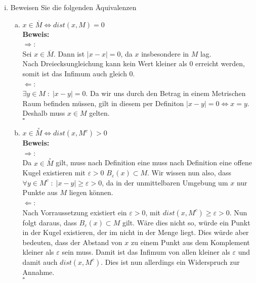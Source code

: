 \documentclass[11pt,a4paper,ngerman]{article}
\begin{document}
\begin{enumerate}[(i)]
		\item Beweisen Sie die folgenden Äquivalenzen
			\begin{enumerate}[a)]
				\item $x \in \overline{M} \Longleftrightarrow dist(x,M) = 0$\\
				\textbf{Beweis:}\\
				    $\Rightarrow$:\\
                        Sei $x \in \overline{M}$. Dann ist
                        $|x - x| = 0$, da $x$ insbesondere in $M$ lag.\\
                        Nach Dreiecksungleichung kann kein Wert kleiner als
                        0 erreicht werden, somit ist das Infimum auch gleich 0.\\

                    $\Leftarrow$:\\
                        $\exists y \in M \; : \; |x - y | = 0$. Da wir uns 
                        durch den Betrag in einem Metrischen Raum befinden müssen,
                        gilt in diesem per Definiton $|x - y| = 0 \Leftrightarrow x = y$.
                        Deshalb muss $x \in M$ gelten.\\
                    \mbox{} \hfill $\square$	

				\item $x \in \overset{\circ}{M} \Longleftrightarrow dist(x,M^c) > 0$\\
				\textbf{Beweis:}\\
				    $\Rightarrow$:\\
                        Da $x \in \overset{\circ}{M}$ gilt, muss nach Definition eine
                        muss nach Definition eine offene Kugel existieren mit $\varepsilon > 0$
                        $B_\varepsilon(x) \subset M$. Wir wissen nun also, dass
                        $\forall y \in M^c \; : \; |x - y | \geq \varepsilon > 0$, da in
                        der unmittelbaren Umgebung um $x$ nur Punkte aus $M$ liegen können.\\

                    $\Leftarrow$:\\
                        Nach Vorraussetzung existiert ein $\varepsilon > 0$, mit
                        $dist(x,M^c) \geq \varepsilon > 0$. Nun folgt daraus, dass
                        $B_\varepsilon(x) \subset M$ gilt. Wäre dies nicht so,
                        würde ein Punkt in der Kugel existieren, der im nicht in der Menge
                        liegt. Dies würde aber bedeuten, dass der Abstand von $x$ zu einem
                        Punkt aus dem Komplement kleiner als $\varepsilon$ sein muss.
                        Damit ist das Infimum von allen kleiner als $\varepsilon$ und damit
                        auch $dist(x,M^c)$. Dies ist nun allerdings ein Widerspruch zur Annahme.\\
                    \mbox{} \hfill $\square$


\end{enumerate}
\end{enumerate}
\end{document}
